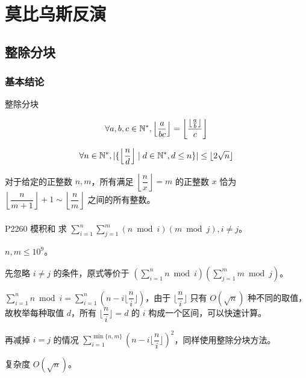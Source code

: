 \documentclass[../main.tex]{subfiles}
\begin{document}
\section{莫比乌斯反演}

\subsection{整除分块}

\subsubsection{基本结论}

\begin{frame}{整除分块}
\begin{theo}
$$
\forall a,b,c\in \mathbb{N}^{*},\left\lfloor\frac{a}{bc}\right\rfloor=\left\lfloor\frac{\lfloor\frac{a}{b}\rfloor}{c}\right\rfloor
$$
\end{theo}\pause

\begin{theo}
$$
\forall n\in\mathbb{N}^{*},|\{\left\lfloor\frac{n}{d}\right\rfloor\mid d\in\mathbb{N}^{*},d\le n \}|\le\lfloor2\sqrt n\rfloor
$$
\end{theo}
\end{frame}

\begin{frame}
\begin{theo}
对于给定的正整数 $n,m$，所有满足 $\left\lfloor\dfrac{n}{x}\right\rfloor=m$ 的正整数 $x$ 恰为 $\left\lfloor\dfrac{n}{m+1}\right\rfloor+1\sim \left\lfloor\dfrac{n}{m}\right\rfloor$ 之间的所有整数。
\end{theo}
\end{frame}

\subsubsection{}

\begin{frame}{P2260 模积和}
求 $\sum\limits_{i=1}^n\sum\limits_{j=1}^m(n\bmod i)(m\bmod j),i\neq j$。

$n,m\le 10^9$。
\end{frame}

\begin{frame}
先忽略 $i\neq j$ 的条件，原式等价于 $(\sum\limits_{i=1}^n n\bmod i)(\sum\limits_{j=1}^mm\bmod j)$。\pause

$\sum\limits_{i=1}^nn\bmod i=\sum\limits_{i=1}^n(n-i\lfloor\dfrac{n}{i}\rfloor)$，由于 $\lfloor\dfrac{n}{i}\rfloor$ 只有 $O(\sqrt n)$ 种不同的取值，故枚举每种取值 $d$，所有 $\lfloor\dfrac{n}{i}\rfloor=d$ 的 $i$ 构成一个区间，可以快速计算。\pause

再减掉 $i=j$ 的情况 $\sum\limits_{i=1}^{\min\{n,m\}}(n-i\lfloor\dfrac{n}{i}\rfloor)^2$，同样使用整除分块方法。\pause

复杂度 $O(\sqrt n)$。
\end{frame}
\end{document}
